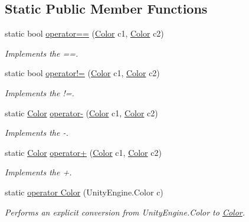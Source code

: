 \subsection*{Static Public Member Functions}
\begin{DoxyCompactItemize}
\item 
static bool \hyperlink{struct_lerp2_a_p_i_1_1_optimizers_1_1_color_a5448b70a7c00c697434c6352b22dffd6}{operator==} (\hyperlink{struct_lerp2_a_p_i_1_1_optimizers_1_1_color}{Color} c1, \hyperlink{struct_lerp2_a_p_i_1_1_optimizers_1_1_color}{Color} c2)
\begin{DoxyCompactList}\small\item\em Implements the ==. \end{DoxyCompactList}\item 
static bool \hyperlink{struct_lerp2_a_p_i_1_1_optimizers_1_1_color_a79bcf4f099d008bd3dacf5e81d81fa42}{operator!=} (\hyperlink{struct_lerp2_a_p_i_1_1_optimizers_1_1_color}{Color} c1, \hyperlink{struct_lerp2_a_p_i_1_1_optimizers_1_1_color}{Color} c2)
\begin{DoxyCompactList}\small\item\em Implements the !=. \end{DoxyCompactList}\item 
static \hyperlink{struct_lerp2_a_p_i_1_1_optimizers_1_1_color}{Color} \hyperlink{struct_lerp2_a_p_i_1_1_optimizers_1_1_color_af77126d81506d4210e1043ab8a2ff7b2}{operator-\/} (\hyperlink{struct_lerp2_a_p_i_1_1_optimizers_1_1_color}{Color} c1, \hyperlink{struct_lerp2_a_p_i_1_1_optimizers_1_1_color}{Color} c2)
\begin{DoxyCompactList}\small\item\em Implements the -\/. \end{DoxyCompactList}\item 
static \hyperlink{struct_lerp2_a_p_i_1_1_optimizers_1_1_color}{Color} \hyperlink{struct_lerp2_a_p_i_1_1_optimizers_1_1_color_ac45038b10bb655fe92153ee7f52389b4}{operator+} (\hyperlink{struct_lerp2_a_p_i_1_1_optimizers_1_1_color}{Color} c1, \hyperlink{struct_lerp2_a_p_i_1_1_optimizers_1_1_color}{Color} c2)
\begin{DoxyCompactList}\small\item\em Implements the +. \end{DoxyCompactList}\item 
static \hyperlink{struct_lerp2_a_p_i_1_1_optimizers_1_1_color_a1aeb2ba72664070af9936ab9d68ef23d}{operator Color} (Unity\+Engine.\+Color c)
\begin{DoxyCompactList}\small\item\em Performs an explicit conversion from Unity\+Engine.\+Color to \hyperlink{struct_lerp2_a_p_i_1_1_optimizers_1_1_color}{Color}. \end{DoxyCompactList}\item 

\end{DoxyCompactItemize}
